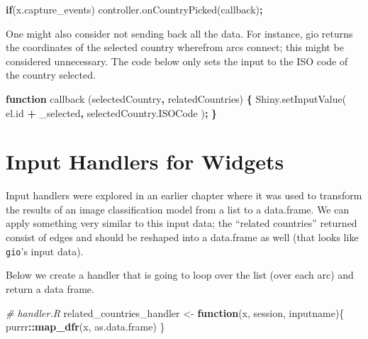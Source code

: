 \documentclass[
]{krantz}
\makeatletter
\newenvironment{Shaded}{\begin{snugshade}}{\end{snugshade}}
\newcommand{\AttributeTok}[1]{\textcolor[rgb]{0.61,0.61,0.61}{#1}}
\newcommand{\CommentTok}[1]{\textcolor[rgb]{0.37,0.37,0.37}{\textit{#1}}}
\newcommand{\ControlFlowTok}[1]{\textcolor[rgb]{0.27,0.27,0.27}{\textbf{#1}}}
\newcommand{\KeywordTok}[1]{\textcolor[rgb]{0.27,0.27,0.27}{\textbf{#1}}}
\newcommand{\NormalTok}[1]{#1}
\newcommand{\OperatorTok}[1]{\textcolor[rgb]{0.43,0.43,0.43}{\textbf{#1}}}
\newcommand{\StringTok}[1]{\textcolor[rgb]{0.5,0.5,0.5}{#1}}
\newcommand{\VariableTok}[1]{\textcolor[rgb]{0,0,0}{#1}}
\newenvironment{kframe}{%
\medskip{}
\setlength{\fboxsep}{.8em}
 \def\at@end@of@kframe{}%
 \ifinner\ifhmode%
  \def\at@end@of@kframe{\end{minipage}}%
  \begin{minipage}{\columnwidth}%
 \fi\fi%
 \def\FrameCommand##1{\hskip\@totalleftmargin \hskip-\fboxsep
 \colorbox{shadecolor}{##1}\hskip-\fboxsep
     \hskip-\linewidth \hskip-\@totalleftmargin \hskip\columnwidth}%
 \MakeFramed {\advance\hsize-\width
   \@totalleftmargin\z@ \linewidth\hsize
   \@setminipage}}%
 {\par\unskip\endMakeFramed%
 \at@end@of@kframe}
\renewenvironment{Shaded}{\begin{kframe}}{\end{kframe}}
\makeatother
\begin{document}
\begin{Shaded}
\begin{Highlighting}[]
\ControlFlowTok{if}\NormalTok{(}\VariableTok{x}\NormalTok{.}\AttributeTok{capture\_events}\NormalTok{)}
  \VariableTok{controller}\NormalTok{.}\AttributeTok{onCountryPicked}\NormalTok{(callback)}\OperatorTok{;}
\end{Highlighting}
\end{Shaded}

One might also consider not sending back all the data. For instance, gio returns the coordinates of the selected country wherefrom arcs connect; this might be considered unnecessary. The code below only sets the input to the ISO code of the country selected.

\begin{Shaded}
\begin{Highlighting}[]
\KeywordTok{function} \AttributeTok{callback}\NormalTok{ (selectedCountry}\OperatorTok{,}\NormalTok{ relatedCountries) }\OperatorTok{\{}
  \VariableTok{Shiny}\NormalTok{.}\AttributeTok{setInputValue}\NormalTok{(}
    \VariableTok{el}\NormalTok{.}\AttributeTok{id} \OperatorTok{+} \StringTok{\textquotesingle{}\_selected\textquotesingle{}}\OperatorTok{,} 
    \VariableTok{selectedCountry}\NormalTok{.}\AttributeTok{ISOCode}
\NormalTok{  )}\OperatorTok{;}
\OperatorTok{\}}
\end{Highlighting}
\end{Shaded}

\hypertarget{shiny-widgets-handlers}{%
\section{Input Handlers for Widgets}\label{shiny-widgets-handlers}}

Input handlers were explored in an earlier chapter where it was used to transform the results of an image classification model from a list to a data.frame. We can apply something very similar to this input data; the ``related countries'' returned consist of edges and should be reshaped into a data.frame as well (that looks like \texttt{gio}'s input data).

Below we create a handler that is going to loop over the list (over each arc) and return a data frame.

\begin{Shaded}
\begin{Highlighting}[]
\CommentTok{\# handler.R}
\NormalTok{related\_countries\_handler <{-}}\StringTok{ }\ControlFlowTok{function}\NormalTok{(x, session, inputname)\{}
\NormalTok{  purrr}\OperatorTok{::}\KeywordTok{map\_dfr}\NormalTok{(x, as.data.frame)}
\NormalTok{\}}
\end{Highlighting}
\end{Shaded}
\end{document}
